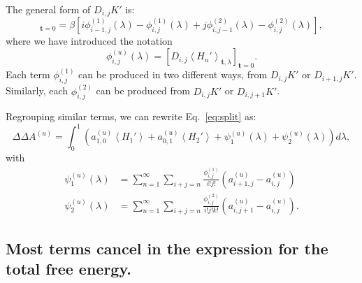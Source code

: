 \documentclass{article}
\let\vec\mathbf
\begin{document}
The general form of $D_{i,j}K'$ is:
\begin{equation}
[D_{i,j}K_\lambda']_{\vec t=0} =
	\beta\left[
		i \phi_{i-1, j}^{(1)}(\lambda) -
    	\phi_{i,j}^{(1)}(\lambda) +
    	j \phi_{i, j-1}^{(2)}(\lambda) -
    	\phi_{i,j}^{(2)}(\lambda)
    \right],
\label{eq:deriv}
\end{equation}
where we have introduced the notation
\begin{equation}
\phi_{i,j}^{(u)}(\lambda) =
	\left[ D_{i,j} \left\langle
    	H_u'
    \right\rangle_{\vec t, \lambda} \right]_{\vec t=0}.
\end{equation}
Each term $\phi_{i,j}^{(1)}$ can be produced in two different ways, from $D_{i,j}K'$ or $D_{i+1,j}K'$. Similarly, each $\phi_{i,j}^{(2)}$ can be produced from $D_{i,j}K'$ or $D_{i,j+1}K'$.

Regrouping similar terms, we can rewrite Eq.~\ref{eq:split} as:
\begin{equation}
\Delta\Delta A^{(u)} =
	\int_0^1 \left(
        a_{1,0}^{(u)}\left\langle H_1' \right\rangle +
        a_{0,1}^{(u)}\left\langle H_2' \right\rangle +
        \psi_1^{(u)}(\lambda) +
        \psi_2^{(u)}(\lambda)
    \right) d\lambda,
\end{equation}
with
\begin{align}
\psi_1^{(u)}(\lambda) &=
	\sum_{n=1}^{\infty}
    \sum_{i+j=n}
        \frac{\phi_{i,j}^{(1)}}{i!j!}
        \left(
            {a_{i+1,j}^{(u)}} -
            {a_{i,j}^{(u)}}
        \right) \label{eq:psi1}\\
\psi_2^{(u)}(\lambda) &=
	\sum_{n=1}^{\infty}
    \sum_{i+j=n}
        \frac{\phi_{i,j}^{(2)}}{i!j!k!}
        \left(
            a_{i,j+1}^{(u)} -
            a_{i,j}^{(u)}
      	\right)\label{eq:psi2}.
\end{align}



\subsection{Most terms cancel in the expression for the total free energy.}
\end{document}
